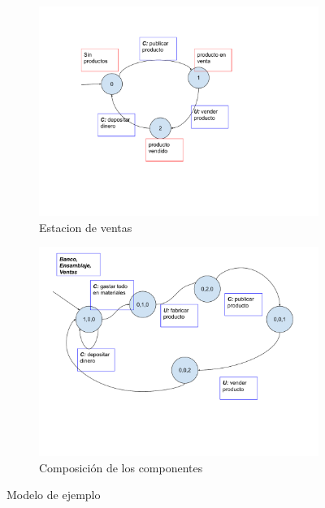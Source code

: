 \begin{figure}[htb]
\begin{center}
{\begin{subfigure}[t]{.7\textwidth}
		\centering
		\includegraphics[width=\linewidth]{figures/ModeloVentas.pdf}  
		\caption{Estacion de ventas}
		\label{fig:modeloVentas}
	\end{subfigure}
	\begin{subfigure}[t]{.7\textwidth}
	\centering
	\includegraphics[width=\linewidth]{figures/ModeloCompuestoSin2Caminos.pdf}  
	\caption{Composición de los componentes}
	\label{fig:compuesto}
	\end{subfigure}
	}
	\caption{Modelo de ejemplo}
	\label{fig:modelos}
	\end{center}
\end{figure}




















